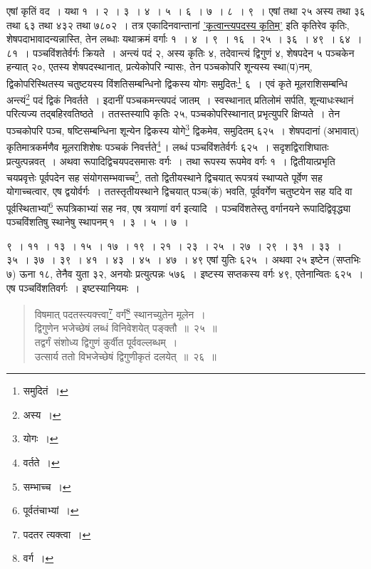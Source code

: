 \documentclass[10pt, openany]{book}
\begin{document}
{{एषां कृतिं वद~। यथा १~। २~। ३~। ४~। ५~। ६~। ७~। ८~। ९~। एषां तथा २५}
{अस्य तथा ३६ तथा ६३ तथा ४३२ तथा ७८०२~। तत्र एकादिनवान्तानां
\hyperref[23]{'कृत्वान्त्यपदस्य कृतिम्'} इति कृतिरेव कृतिः, शेषपदाभावादन्यन्नास्ति, तेन लब्धाः यथाक्रमं
वर्गाः १~। ४~। ९~।}
{१६~। २५~। ३६~। ४९~। ६४~। ८१~। पञ्चविंशतेर्वर्गः क्रियते~। अन्त्यं पदं
२, अस्य कृतिः ४,}
{तदेवान्त्यं द्विगुणं ४, शेषपदेन ५ पञ्चकेन हन्यात् २०, एतस्य
शेषपदस्थानात्, प्रत्येकोपरि}
{न्यासः, तेन पञ्चकोपरि शून्यस्य स्था(प)नम्, द्विकोपरिस्थितस्य चतुष्टयस्य
विंशतिसम्बन्धिनो}
{द्विकस्य योगः समुदितः\renewcommand{\thefootnote}{\s ६}\footnote{\s समुदितं~।} ६~। एवं कृते मूलराशिसम्बन्धि अन्त्यं\renewcommand{\thefootnote}{\s ७}\footnote{\s अस्य~।}
पदं द्विकं निवर्तते~। इदानीं}
{पञ्चकमन्त्यपदं जातम्~। स्वस्थानात् प्रतिलोमं सर्पति, शून्याधःस्थानं
परित्यज्य तद्बहिरवतिष्ठते~।}
{ततस्तस्यापि कृतिः २५, पञ्चकोपरिस्थानात् प्रभृत्युपरि क्षिप्यते~। तेन
पञ्चकोपरि पञ्च,}
{षष्टिसम्बन्धिना शून्येन द्विकस्य योगे\renewcommand{\thefootnote}{\s ८}\footnote{\s योगः~।} द्विकमेव, समुदितम् ६२५~।
शेषपदानां (अभावात्)}
{कृतिमात्रकर्मणैव मूलराशिशेषः पञ्चकं निवर्त्तते\renewcommand{\thefootnote}{\s ९}\footnote{\s वर्तते~।}\,। लब्धं
पञ्चविंशतेर्वर्गः ६२५~। सदृशद्विराशिघातः प्रत्युत्पन्नवत्~। अथवा रूपादिद्विचयपदसमासः वर्गः~। तथा रूपस्य
रूपमेव वर्गः १~।}
{द्वितीयात्प्रभृति चयप्रवृत्तेः पूर्वपदेन सह संयोगसम्भवाच्च\renewcommand{\thefootnote}{\s १०}\footnote{\s *सम्भाच्च~।}, ततो
द्वितीयस्थाने द्विचयात् रूपत्रयं}
{स्थाप्यते पूर्वेण सह योगाच्चत्वार, एष द्वयोर्वर्गः~। ततस्तृतीयस्थाने
द्विचयात् पञ्च(कं) भवति,}
{पूर्ववर्गेण चतुष्टयेन सह यदि वा पूर्वस्थिताभ्यां\renewcommand{\thefootnote}{\s ११}\footnote{\s पूर्वतंचाभ्यां~।} रूपत्रिकाभ्यां
सह नव, एष त्रयाणां वर्ग इत्यादि~।}
{पञ्चविंशतेस्तु वर्गानयने रूपादिद्विवृद्ध्या पञ्चविंशतिषु स्थानेषु
स्थापनम्\textendash \,१~। ३~। ५~। ७~।}


\newpage

\noindent ९~। ११~। १३~। १५~। १७~। १९~। २१~। २३~। २५~। २७~। २९~। ३१~। ३३~। ३५~। ३७~। ३९~। ४१~। ४३~। ४५~। ४७~। ४९ एषां युतिः ६२५~। अथवा २५ इष्टेन (सप्तभिः ७)
{ऊना १८, तेनैव युता ३२, अनयोः प्रत्युत्पन्नः ५७६~। इष्टस्य सप्तकस्य
वर्गः ४९, एतेनान्वितः}
{६२५~। एष पञ्चविंशतिवर्गः~। इष्टस्यानियमः~।}\\


\begin{quote}
{\bs  विषमात् पदतस्त्यक्त्त्वा\renewcommand{\thefootnote}{\s २}\footnote{\s पदतर त्यक्त्वा~।} वर्गं\renewcommand{\thefootnote}{\s ३}\footnote{\s वर्ग~।} स्थानच्युतेन मूलेन~। \\
 द्विगुणेन भजेच्छेषं लब्धं विनिवेशयेत् पङ्क्तौ~॥~२५~॥ \\
 तद्वर्गं संशोध्य द्विगुणं कुर्वीत पूर्ववल्लब्धम्~। \\
 उत्सार्य ततो विभजेच्छेषं द्विगुणीकृतं दलयेत्~॥~२६~॥}\end{quote} 

}
\end{document}
